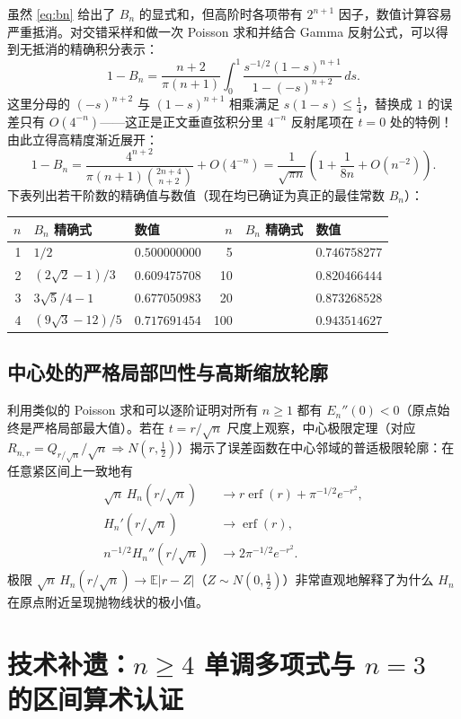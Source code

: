 \documentclass[UTF8,fontset=windows,a4paper,11pt]{ctexart}
\newcommand{\E}{\mathbb{E}}
\begin{document}
虽然 \eqref{eq:bn} 给出了 $B_n$ 的显式和，但高阶时各项带有 $2^{n+1}$ 因子，数值计算容易严重抵消。对交错采样和做一次 Poisson 求和并结合 Gamma 反射公式，可以得到无抵消的精确积分表示：
\[
    1 - B_n = \frac{n+2}{\pi(n+1)}\int_0^1 \frac{s^{-1/2}(1-s)^{n+1}}{1-(-s)^{n+2}}\,ds.
\]
这里分母的 $(-s)^{n+2}$ 与 $(1-s)^{n+1}$ 相乘满足 $s(1-s)\le\frac14$，替换成 $1$ 的误差只有 $O(4^{-n})$——这正是正文垂直弦积分里 $4^{-n}$ 反射尾项在 $t=0$ 处的特例！由此立得高精度渐近展开：
\[
    1 - B_n = \frac{4^{n+2}}{\pi(n+1)\binom{2n+4}{n+2}} + O(4^{-n})
    = \frac{1}{\sqrt{\pi n}}\left(1+\frac{1}{8n}+O(n^{-2})\right).
\]
下表列出若干阶数的精确值与数值（现在均已确证为真正的最佳常数 $B_n$）：
\begin{center}
\begin{tabular}{rll@{\qquad}rll}
\toprule
$n$ & $B_n$ 精确式 & 数值 & $n$ & $B_n$ 精确式 & 数值\\
\midrule
1 & $1/2$ & $0.500000000$ & 5 & & $0.746758277$ \\
2 & $(2\sqrt2-1)/3$ & $0.609475708$ & 10 & & $0.820466444$ \\
3 & $3\sqrt5/4-1$ & $0.677050983$ & 20 & & $0.873268528$ \\
4 & $(9\sqrt3-12)/5$ & $0.717691454$ & 100 & & $0.943514627$ \\
\bottomrule
\end{tabular}
\end{center}

\subsection{中心处的严格局部凹性与高斯缩放轮廓}

利用类似的 Poisson 求和可以逐阶证明对所有 $n\ge 1$ 都有 $E_n''(0)<0$（原点始终是严格局部最大值）。若在 $t=r/\sqrt{n}$ 尺度上观察，中心极限定理（对应 $R_{n,r}=Q_{r/\sqrt{n}}/\sqrt{n}\Rightarrow N(r,\frac12)$）揭示了误差函数在中心邻域的普适极限轮廓：在任意紧区间上一致地有
\begin{align*}
    \sqrt{n}\,H_n(r/\sqrt{n}) &\longrightarrow r\operatorname{erf}(r)+\pi^{-1/2}e^{-r^2},\\
    H_n'(r/\sqrt{n}) &\longrightarrow \operatorname{erf}(r),\\
    n^{-1/2}H_n''(r/\sqrt{n}) &\longrightarrow 2\pi^{-1/2}e^{-r^2}.
\end{align*}
极限 $\sqrt{n}\,H_n(r/\sqrt{n})\to \E|r-Z|$（$Z\sim N(0,\frac12)$）非常直观地解释了为什么 $H_n$ 在原点附近呈现抛物线状的极小值。

\section{技术补遗：$n\ge 4$ 单调多项式与 $n=3$ 的区间算术认证}
\end{document}
